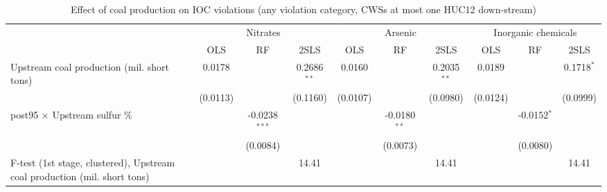 
\begin{table}[htbp]
   
   \caption{\label{2sls_dwnstrm_minevio_allcat_ivsumcoaltons_binvio} Effect of coal production on IOC violations (any violation category, CWSs at most one HUC12 down-stream)}
   \bigskip
   
   \centering
   
   \begin{adjustbox}{width = \textwidth, center}
      
      
      \begin{tabular}{lccccccccc}
         \toprule
         
          & \multicolumn{3}{c}{Nitrates} & \multicolumn{3}{c}{Arsenic} & \multicolumn{3}{c}{Inorganic chemicals}\\
         
                                                                                   & OLS           & RF              & 2SLS          & OLS           & RF             & 2SLS          & OLS           & RF            & 2SLS\\  
         
         \midrule 
         Upstream coal production (mil. short tons)                                & 0.0178        &                 & 0.2686$^{**}$ & 0.0160        &                & 0.2035$^{**}$ & 0.0189        &               & 0.1718$^{*}$\\   
                                                                                   & (0.0113)      &                 & (0.1160)      & (0.0107)      &                & (0.0980)      & (0.0124)      &               & (0.0999)\\   
         post95 $\times$ Upstream sulfur \%                                        &               & -0.0238$^{***}$ &               &               & -0.0180$^{**}$ &               &               & -0.0152$^{*}$ &   \\   
                                                                                   &               & (0.0084)        &               &               & (0.0073)       &               &               & (0.0080)      &   \\   
         
         F-test (1st stage, clustered), Upstream coal production (mil. short tons) &               &                 & 14.41         &               &                & 14.41         &               &               & 14.41\\  
         

\end{tabular}
\end{adjustbox}
\end{table}
